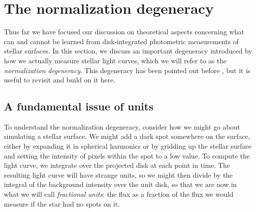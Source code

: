 \documentclass[modern]{aastex62}
\begin{document}
\section{The normalization degeneracy}
\label{sec:normalization}

Thus far we have focused our discussion on theoretical aspects concerning
what can and cannot be learned from disk-integrated photometric measurements
of stellar surfaces. In this section, we discuss an important degeneracy
introduced by how we actually measure stellar light curves, which we
will refer to as the \emph{normalization degeneracy}. This degeneracy has been
pointed out before \citep[e.g.,][]{Basri2018}, but it is useful to revisit and
build on it here.

\subsection{A fundamental issue of units}
%
To understand the normalization degeneracy, consider how we might go about simulating
a stellar surface.
%
We might add a dark spot somewhere on the surface, either by expanding
it in spherical harmonics or by gridding up the stellar surface and
setting the intensity of pixels within the spot to a low value. To compute
the light curve, we integrate over the
projected disk at each point in time.
The resulting
light curve will have strange units, so we might then divide by the
integral of the background intensity over the unit disk, so that we are
now in what we will call \emph{fractional units}: the flux as a
fraction of the flux we would measure if the star had no spots on it.
\end{document}
